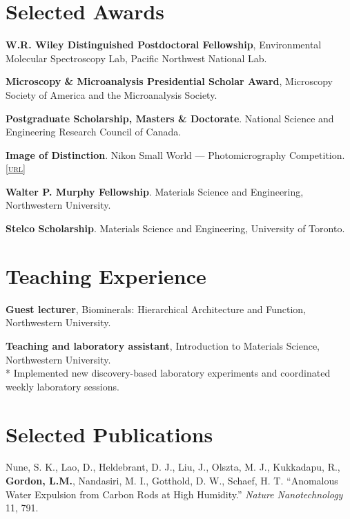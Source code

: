 
\section*{Selected Awards}

\textbf{W.R. Wiley Distinguished Postdoctoral Fellowship}, Environmental Molecular Spectroscopy Lab, Pacific Northwest National Lab.
\begingroup\setlength{\parskip}{0.1cm}

\textbf{Microscopy \& Microanalysis Presidential Scholar Award}, Microscopy Society of America and the Microanalysis Society.

\textbf{Postgraduate Scholarship, Masters \& Doctorate}. National Science and Engineering Research Council of Canada.

\textbf{Image of Distinction}. Nikon Small World --- Photomicrography Competition. \href{http://www.nikonsmallworld.com/detail/year/2009/66}{\textsc{\footnotesize{[url]}}}

\textbf{Walter P. Murphy Fellowship}. Materials Science and Engineering, Northwestern University.

\textbf{Stelco Scholarship}. Materials Science and Engineering, University of Toronto.
\endgroup

\section*{Teaching Experience}
\textbf{Guest lecturer}, Biominerals: Hierarchical Architecture and Function, Northwestern University.
\begingroup\setlength{\parskip}{0.15cm}

\textbf{Teaching and laboratory assistant}, Introduction to Materials Science, Northwestern University.\\*
Implemented new discovery-based laboratory experiments and coordinated weekly laboratory sessions.
\endgroup

\section*{Selected Publications}
Nune, S. K., Lao, D., Heldebrant, D. J., Liu, J., Olszta, M. J., Kukkadapu, R., \textbf{Gordon, L.M.}, Nandasiri, M. I., Gotthold, D. W., Schaef, H. T. “Anomalous Water Expulsion from Carbon Rods at High Humidity.” \emph{Nature Nanotechnology} 11, 791.
\begingroup\setlength{\parskip}{0.15cm}

